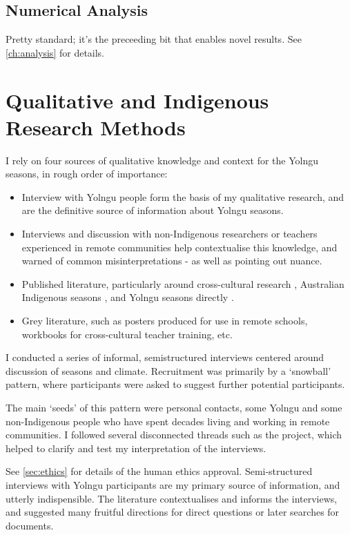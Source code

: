 \subsection{Numerical Analysis}
Pretty standard; it's the preceeding bit that enables novel results.
See \autoref{ch:analysis} for details.






\section{Qualitative and Indigenous Research Methods}


I rely on four sources of qualitative knowledge and context for the Yolngu
seasons, in rough order of importance:

\begin{itemize}
\item Interview with Yolngu people form the basis of my qualitative research, and
        are the definitive source of information about Yolngu seasons.
\item Interviews and discussion with non-Indigenous researchers or teachers experienced
        in remote communities help contextualise this knowledge, and warned of
        common misinterpretations - as well as pointing out nuance.
\item Published literature, particularly around cross-cultural research \citep[eg.][]{smith1999},
        Australian Indigenous seasons \citep[eg.][]{prober2011,oconnor2010}, and Yolngu
        seasons directly \citep{davis1989}.
\item Grey literature, such as posters produced for use in remote schools, workbooks
        for cross-cultural teacher training, etc.
\end{itemize}


I conducted a series of informal, semistructured interviews centered around
discussion of seasons and climate. Recruitment was primarily by a `snowball'
pattern, where participants were asked to suggest further potential participants.

The main `seeds' of this pattern were personal contacts, some Yolngu and some
non-Indigenous people who have spent decades living and working in remote
communities. I followed several disconnected threads such as the
\citet{CSIROcals} project, which helped to clarify and test my interpretation
of the interviews.

See \autoref{sec:ethics} for details of the human ethics approval.
Semi-structured interviews with Yolngu participants are my primary source
of information, and utterly indispensible.
The literature contextualises and informs the interviews, and suggested many fruitful
directions for direct questions or later searches for documents.

